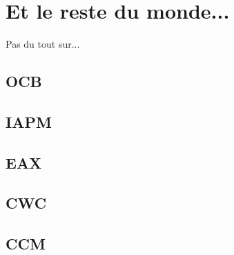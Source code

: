 \chapter{Et le reste du monde...}
\label{chap:autres}

Pas du tout sur...

\section{OCB}

\section{IAPM}

\section{EAX}

\section{CWC}

\section{CCM}






